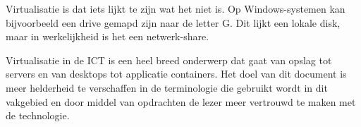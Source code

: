 Virtualisatie is dat iets lijkt te zijn wat het niet is. Op Windows-systemen kan bijvoorbeeld een drive gemapd zijn naar de letter G. Dit lijkt een lokale disk, maar in werkelijkheid is het een netwerk-share.

Virtualisatie in de ICT is een heel breed onderwerp dat gaat van opslag tot servers en van desktops tot applicatie containers. Het doel van  dit document is meer helderheid te verschaffen in de terminologie die gebruikt wordt in dit vakgebied en door middel van opdrachten de lezer meer vertrouwd te maken met de technologie.

